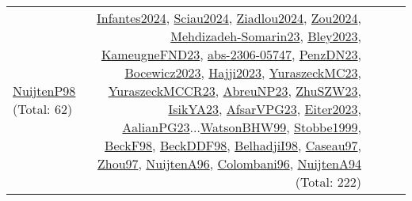{\begin{longtable}{p{3cm}r>{\raggedright\arraybackslash}p{6cm}>{\raggedright\arraybackslash}p{6cm}>{\raggedright\arraybackslash}p{8cm}}
\hyperref[detail:NuijtenP98]{NuijtenP98} (Total: 62) & \hyperref[detail:Infantes2024]{Infantes2024}, \hyperref[detail:Sciau2024]{Sciau2024}, \hyperref[detail:Ziadlou2024]{Ziadlou2024}, \hyperref[detail:Zou2024]{Zou2024}, \hyperref[detail:Mehdizadeh-Somarin23]{Mehdizadeh-Somarin23}, \hyperref[detail:Bley2023]{Bley2023}, \hyperref[detail:KameugneFND23]{KameugneFND23}, \hyperref[detail:abs-2306-05747]{abs-2306-05747}, \hyperref[detail:PenzDN23]{PenzDN23}, \hyperref[detail:Bocewicz2023]{Bocewicz2023}, \hyperref[detail:Hajji2023]{Hajji2023}, \hyperref[detail:YuraszeckMC23]{YuraszeckMC23}, \hyperref[detail:YuraszeckMCCR23]{YuraszeckMCCR23}, \hyperref[detail:AbreuNP23]{AbreuNP23}, \hyperref[detail:ZhuSZW23]{ZhuSZW23}, \hyperref[detail:IsikYA23]{IsikYA23}, \hyperref[detail:AfsarVPG23]{AfsarVPG23}, \hyperref[detail:Eiter2023]{Eiter2023}, \hyperref[detail:AalianPG23]{AalianPG23}...\hyperref[detail:WatsonBHW99]{WatsonBHW99}, \hyperref[detail:Stobbe1999]{Stobbe1999}, \hyperref[detail:BeckF98]{BeckF98}, \hyperref[detail:BeckDDF98]{BeckDDF98}, \hyperref[detail:BelhadjiI98]{BelhadjiI98}, \hyperref[detail:Caseau97]{Caseau97}, \hyperref[detail:Zhou97]{Zhou97}, \hyperref[detail:NuijtenA96]{NuijtenA96}, \hyperref[detail:Colombani96]{Colombani96}, \hyperref[detail:NuijtenA94]{NuijtenA94} (Total: 222)\\

\end{longtable}}
